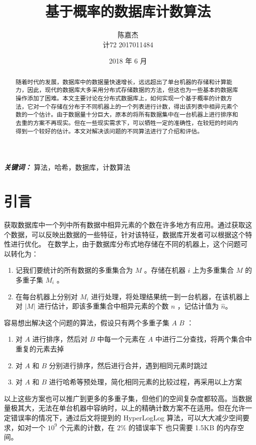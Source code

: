 \documentclass{ctexart}
\title{基于概率的数据库计数算法}
\author{陈嘉杰 \\ 计72 2017011484}
\date{2018 年 6 月}
\begin{document}
\maketitle

\begin{abstract}
    随着时代的发展，数据库中的数据量快速增长，远远超出了单台机器的存储和计算能力，因此，现代的数据库大多采用分布式存储数据的方法，但这也为一些基本的数据库操作添加了困难。本文主要讨论在分布式数据库上，如何实现一个基于概率的计数方法，它对一个存储在分布于不同机器上的一个列表进行计数，得出该列表中相异元素个数的一个估计。由于数据量十分巨大，原本的将所有数据集中在一台机器上进行排序和去重的方案不再现实。但在一些现实需求下，可以牺牲一定的准确性，在较短的时间内得到一个较好的估计。本文对解决该问题的不同算法进行了介绍和评估。
\end{abstract}

\textbf{\textit{关键词： }} 算法，哈希，数据库，计数算法

\section{引言}
    获取数据库中一个列中所有数据中相异元素的个数在许多地方有应用。通过获取这个数据，可以反映出数据的一些特征，针对该特征，数据库开发者可以根据这个特性进行优化。\cite{Whang:1990ei} 在数学上，由于数据库分布式地存储在不同的机器上，这个问题可以转化为：
    \begin{enumerate}
        \item 记我们要统计的所有数据的多重集合为 $M$ 。存储在机器 $i$ 上为多重集合 $M$ 的多重子集 $M_i$ 。
        \item 在每台机器上分别对 $M_i$ 进行处理，将处理结果统一到一台机器，在该机器上对 $\left|M\right|$ 进行估计，即该多重集合中相异元素的个数 $n$ ，记估计值为 $\hat{n}$。
    \end{enumerate}

    容易想出解决这个问题的算法，假设只有两个多重子集 $A$ $B$ \cite{Whang:1990ei}：
    \begin{enumerate}
        \item 对 $A$ 进行排序，然后对 $B$ 中每一个元素在 $A$ 中进行二分查找，将两个集合中重复的元素去掉
        \item 对 $A$ 和 $B$ 分别进行排序，然后进行合并，遇到相同元素时跳过
        \item 对 $A$ 和 $B$ 进行哈希等预处理，简化相同元素的比较过程，再采用以上方案
    \end{enumerate}

    以上这些方案也可以推广到更多的多重子集，但他们的空间复杂度都较高。当数据量极其大，无法在单台机器中容纳时，以上的精确计数方案不在适用。但在允许一定错误率的情况下，通过后文将提到的 HyperLogLog 算法，可以大大减少空间要求，如对一个 $10^9$ 个元素的计数，在 $2\%$ 的错误率下 也只需要 1.5KB 的内存空间。\cite{Flajolet:2007um}
\end{document}
